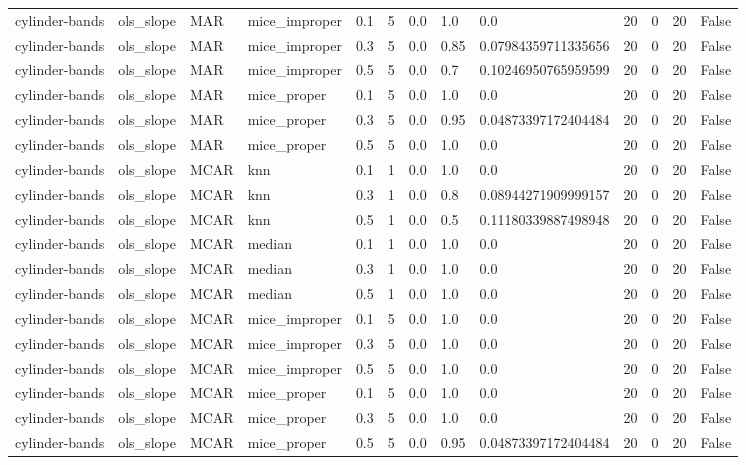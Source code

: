 \begin{tabular}{lllllllllllll}
cylinder-bands & ols\_slope & MAR & mice\_improper & 0.1 & 5 & 0.0 & 1.0 & 0.0 & 20 & 0 & 20 & False \\
cylinder-bands & ols\_slope & MAR & mice\_improper & 0.3 & 5 & 0.0 & 0.85 & 0.07984359711335656 & 20 & 0 & 20 & False \\
cylinder-bands & ols\_slope & MAR & mice\_improper & 0.5 & 5 & 0.0 & 0.7 & 0.10246950765959599 & 20 & 0 & 20 & False \\
cylinder-bands & ols\_slope & MAR & mice\_proper & 0.1 & 5 & 0.0 & 1.0 & 0.0 & 20 & 0 & 20 & False \\
cylinder-bands & ols\_slope & MAR & mice\_proper & 0.3 & 5 & 0.0 & 0.95 & 0.04873397172404484 & 20 & 0 & 20 & False \\
cylinder-bands & ols\_slope & MAR & mice\_proper & 0.5 & 5 & 0.0 & 1.0 & 0.0 & 20 & 0 & 20 & False \\
cylinder-bands & ols\_slope & MCAR & knn & 0.1 & 1 & 0.0 & 1.0 & 0.0 & 20 & 0 & 20 & False \\
cylinder-bands & ols\_slope & MCAR & knn & 0.3 & 1 & 0.0 & 0.8 & 0.08944271909999157 & 20 & 0 & 20 & False \\
cylinder-bands & ols\_slope & MCAR & knn & 0.5 & 1 & 0.0 & 0.5 & 0.11180339887498948 & 20 & 0 & 20 & False \\
cylinder-bands & ols\_slope & MCAR & median & 0.1 & 1 & 0.0 & 1.0 & 0.0 & 20 & 0 & 20 & False \\
cylinder-bands & ols\_slope & MCAR & median & 0.3 & 1 & 0.0 & 1.0 & 0.0 & 20 & 0 & 20 & False \\
cylinder-bands & ols\_slope & MCAR & median & 0.5 & 1 & 0.0 & 1.0 & 0.0 & 20 & 0 & 20 & False \\
cylinder-bands & ols\_slope & MCAR & mice\_improper & 0.1 & 5 & 0.0 & 1.0 & 0.0 & 20 & 0 & 20 & False \\
cylinder-bands & ols\_slope & MCAR & mice\_improper & 0.3 & 5 & 0.0 & 1.0 & 0.0 & 20 & 0 & 20 & False \\
cylinder-bands & ols\_slope & MCAR & mice\_improper & 0.5 & 5 & 0.0 & 1.0 & 0.0 & 20 & 0 & 20 & False \\
cylinder-bands & ols\_slope & MCAR & mice\_proper & 0.1 & 5 & 0.0 & 1.0 & 0.0 & 20 & 0 & 20 & False \\
cylinder-bands & ols\_slope & MCAR & mice\_proper & 0.3 & 5 & 0.0 & 1.0 & 0.0 & 20 & 0 & 20 & False \\
cylinder-bands & ols\_slope & MCAR & mice\_proper & 0.5 & 5 & 0.0 & 0.95 & 0.04873397172404484 & 20 & 0 & 20 & False \\

\end{tabular}
